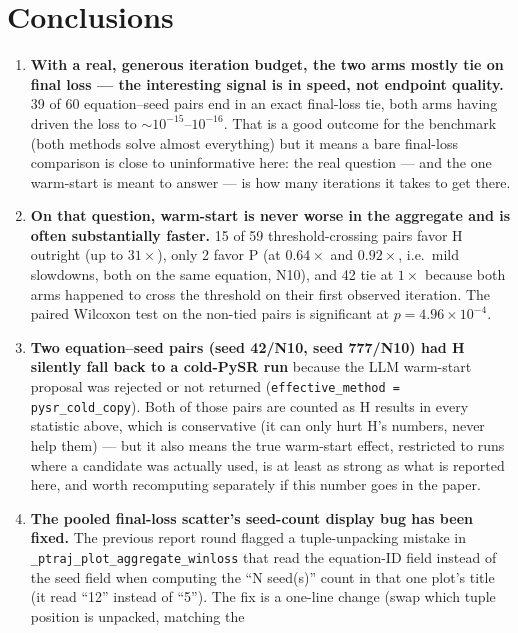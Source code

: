 \documentclass[11pt]{article}
\begin{document}
\FloatBarrier
\section{Conclusions}
\label{sec:conclusions}

\begin{enumerate}
  \item \textbf{With a real, generous iteration budget, the two arms mostly tie on final loss ---
    the interesting signal is in speed, not endpoint quality.} 39 of 60 equation--seed pairs end
    in an exact final-loss tie, both arms having driven the loss to
    $\sim\!10^{-15}$--$10^{-16}$. That is a good outcome for the benchmark (both methods solve
    almost everything) but it means a bare final-loss comparison is close to uninformative here:
    the real question --- and the one warm-start is meant to answer --- is how many iterations it
    takes to get there.
  \item \textbf{On that question, warm-start is never worse in the aggregate and is often
    substantially faster.} 15 of 59 threshold-crossing pairs favor H outright (up to $31\times$),
    only 2 favor P (at $0.64\times$ and $0.92\times$, i.e.\ mild slowdowns, both on the same
    equation, N10), and 42 tie at $1\times$ because both arms happened to cross the threshold on
    their first observed iteration. The paired Wilcoxon test on the non-tied pairs is significant
    at $p=4.96\times10^{-4}$.
  \item \textbf{Two equation--seed pairs (seed 42/N10, seed 777/N10) had H silently fall back to a
    cold-PySR run} because the LLM warm-start proposal was rejected or not returned
    (\texttt{effective\_method = pysr\_cold\_copy}). Both of those pairs are counted as H results in
    every statistic above, which is conservative (it can only hurt H's numbers, never help them) ---
    but it also means the true warm-start effect, restricted to runs where a candidate was actually
    used, is at least as strong as what is reported here, and worth recomputing separately if this
    number goes in the paper.
  \item \textbf{The pooled final-loss scatter's seed-count display bug has been fixed.} The
    previous report round flagged a tuple-unpacking mistake in
    \texttt{\_ptraj\_plot\_aggregate\_winloss} that read the equation-ID field instead of the seed
    field when computing the ``N seed(s)'' count in that one plot's title (it read ``12'' instead
    of ``5''). The fix is a one-line change (swap which tuple position is unpacked, matching the

\end{enumerate}
\end{document}
